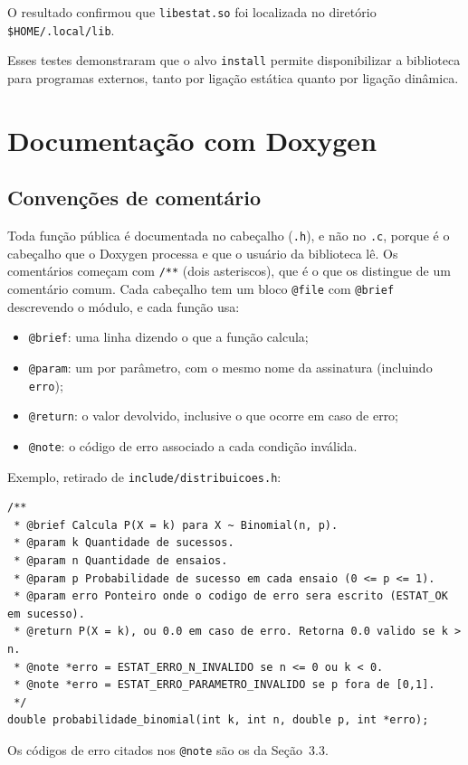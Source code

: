 \documentclass[12pt,a4paper]{article}
\newcommand{\cod}[1]{\texttt{#1}}
\begin{document}
O resultado confirmou que \cod{libestat.so} foi
localizada no diretório \cod{\$HOME/.local/lib}.

Esses testes demonstraram que o alvo \cod{install}
permite disponibilizar a biblioteca para programas
externos, tanto por ligação estática quanto por
ligação dinâmica.

\section{Documentação com Doxygen}

\subsection{Convenções de comentário}
Toda função pública é documentada no cabeçalho (\cod{.h}), e não no \cod{.c},
porque é o cabeçalho que o Doxygen processa e que o usuário da biblioteca lê.
Os comentários começam com \cod{/**} (dois asteriscos), que é o que os
distingue de um comentário comum. Cada cabeçalho tem um bloco \cod{@file} com
\cod{@brief} descrevendo o módulo, e cada função usa:
\begin{itemize}[leftmargin=*]
  \item \cod{@brief}: uma linha dizendo o que a função calcula;
  \item \cod{@param}: um por parâmetro, com o mesmo nome da assinatura
        (incluindo \cod{erro});
  \item \cod{@return}: o valor devolvido, inclusive o que ocorre em caso de erro;
  \item \cod{@note}: o código de erro associado a cada condição inválida.
\end{itemize}
Exemplo, retirado de \cod{include/distribuicoes.h}:
\begin{lstlisting}[style=c]
/**
 * @brief Calcula P(X = k) para X ~ Binomial(n, p).
 * @param k Quantidade de sucessos.
 * @param n Quantidade de ensaios.
 * @param p Probabilidade de sucesso em cada ensaio (0 <= p <= 1).
 * @param erro Ponteiro onde o codigo de erro sera escrito (ESTAT_OK em sucesso).
 * @return P(X = k), ou 0.0 em caso de erro. Retorna 0.0 valido se k > n.
 * @note *erro = ESTAT_ERRO_N_INVALIDO se n <= 0 ou k < 0.
 * @note *erro = ESTAT_ERRO_PARAMETRO_INVALIDO se p fora de [0,1].
 */
double probabilidade_binomial(int k, int n, double p, int *erro);
\end{lstlisting}
Os códigos de erro citados nos \cod{@note} são os da Seção~3.3.
 
\end{document}
